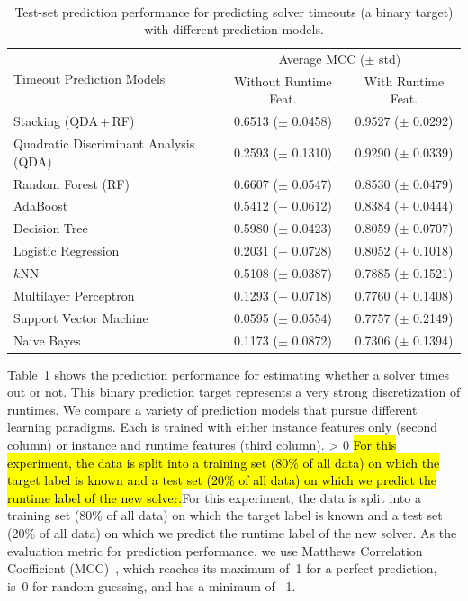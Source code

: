 \documentclass[sn-basic, Numbered]{sn-jnl} %
\newcommand{\showchanges}{1} %
\newcommand{\change}[1]{\ifnum \showchanges > 0 \sethlcolor{yellow}\hl{#1}\else#1\fi}
\begin{document}
\begin{table}[tb]
	\centering
	\caption{Test-set prediction performance for predicting solver timeouts (a binary target) with different prediction models.}
	\label{tab:timeout-prediction}
	~\\[1em]
	\begin{tabular}{lcc}
		\toprule
		\multirow[c]{2}{*}[-0.27em]{Timeout Prediction Models} & \multicolumn{2}{c}{Average MCC ($\pm$ std)} \\
		\cmidrule(lr){2-3}
		& {Without Runtime Feat.} & {With Runtime Feat.} \\
		\midrule
		Stacking (QDA\,+\,RF)                 & 0.6513 ($\pm$ 0.0458) & 0.9527 ($\pm$ 0.0292) \\[0.4ex]
		Quadratic Discriminant Analysis (QDA)                    & 0.2593 ($\pm$ 0.1310) & 0.9290 ($\pm$ 0.0339) \\[0.4ex]
		Random Forest (RF)         & 0.6607 ($\pm$ 0.0547) & 0.8530 ($\pm$ 0.0479) \\[0.4ex]
		AdaBoost                             & 0.5412 ($\pm$ 0.0612) & 0.8384 ($\pm$ 0.0444) \\[0.4ex]
		Decision Tree                         & 0.5980 ($\pm$ 0.0423) & 0.8059 ($\pm$ 0.0707) \\[0.4ex]
		Logistic Regression                   & 0.2031 ($\pm$ 0.0728) & 0.8052 ($\pm$ 0.1018) \\[0.4ex]
		$k$NN                   & 0.5108 ($\pm$ 0.0387) & 0.7885 ($\pm$ 0.1521) \\[0.4ex]
		Multilayer Perceptron                      & 0.1293 ($\pm$ 0.0718) & 0.7760 ($\pm$ 0.1408) \\[0.4ex]
		Support Vector Machine               & 0.0595 ($\pm$ 0.0554) & 0.7757 ($\pm$ 0.2149) \\[0.4ex]
		Naive Bayes                           & 0.1173 ($\pm$ 0.0872) & 0.7306 ($\pm$ 0.1394) \\
		\bottomrule
	\end{tabular}
\end{table}

Table~\ref{tab:timeout-prediction} shows the prediction performance for estimating whether a solver times out or not.
This binary prediction target represents a very strong discretization of runtimes.
We compare a variety of prediction models that pursue different learning paradigms.
Each is trained with either instance features only (second column) or instance and runtime features (third column).
\change{For this experiment, the data is split into a training set (80\% of all data) on which the target label is known and a test set (20\% of all data) on which we predict the runtime label of the new solver.}
As the evaluation metric for prediction performance, we use Matthews Correlation Coefficient (MCC)~\cite{gorodkin2004comparing, matthews1975comparison}, which reaches its maximum of~1 for a perfect prediction, is~0 for random guessing, and has a minimum of~-1.
\end{document}
